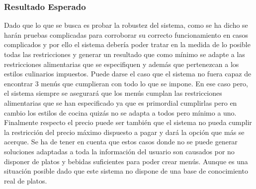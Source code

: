 \documentclass{article}
\begin{document}
\subsubsection{Resultado Esperado}
Dado que lo que se busca es probar la robustez del sistema, como se ha dicho se harán pruebas complicadas para corroborar su correcto funcionamiento en casos complicados y por ello el sistema debería poder tratar en la medida de lo posible todas las restricciones y generar un resultado que como mínimo se adapte a las restricciones alimentarias que se especifiquen y además que pertenezcan a los estilos culinarios impuestos. Puede darse el caso que el sistema no fuera capaz de encontrar 3 menús que cumplieran con todo lo que se impone. En ese caso pero, el sistema siempre se asegurará que los menús cumplan las restricciones alimentarias que se han especificado ya que es primordial cumplirlas pero en cambio los estilos de cocina quizás no se adapta a todos pero mínimo a uno. Finalmente respecto el precio puede ser también que el sistema no pueda cumplir la restricción del precio máximo dispuesto a pagar y dará la opción que más se acerque.
Se ha de tener en cuenta que estos casos donde no se puede generar soluciones adaptadas a toda la información del usuario son causados por no disponer de platos y bebidas suficientes para poder crear menús. Aunque es una situación posible dado que este sistema no dispone de una base de conocimiento real de platos.
\end{document}

